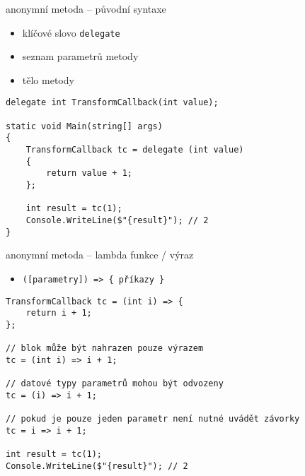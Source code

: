 \begin{frame}[fragile]
\begin{bitemize}{}
\item anonymní metoda -- původní syntaxe
\begin{itemize}
\item klíčové slovo \lstinline|delegate|
\item seznam parametrů metody
\item tělo metody
\end{itemize}
\end{bitemize}
\vfill
\begin{yesblock}
\begin{lstlisting}
delegate int TransformCallback(int value);

static void Main(string[] args)
{
    TransformCallback tc = delegate (int value)
    {
        return value + 1;
    };

    int result = tc(1);
    Console.WriteLine($"{result}"); // 2
}
\end{lstlisting}
\end{yesblock}
\end{frame}




\begin{frame}[fragile]
\begin{bitemize}{}
\item anonymní metoda -- lambda funkce / výraz
\begin{itemize}
\item \lstinline|([parametry]) => { příkazy }|
\end{itemize}
\end{bitemize}
\vfill
\begin{yesblock}
\begin{lstlisting}
TransformCallback tc = (int i) => {
    return i + 1;
};

// blok může být nahrazen pouze výrazem
tc = (int i) => i + 1;

// datové typy parametrů mohou být odvozeny
tc = (i) => i + 1;

// pokud je pouze jeden parametr není nutné uvádět závorky
tc = i => i + 1;

int result = tc(1);
Console.WriteLine($"{result}"); // 2
\end{lstlisting}
\end{yesblock}
\end{frame}







